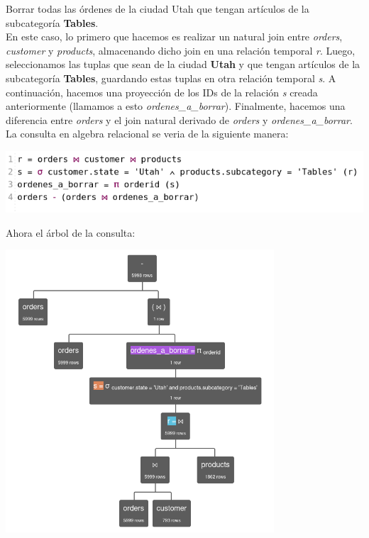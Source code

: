Borrar todas las órdenes de la ciudad Utah que tengan artículos de la subcategoría \textbf{Tables}. \\

En este caso, lo primero que hacemos es realizar un natural join entre \textit{orders}, \textit{customer} y \textit{products}, almacenando dicho join en una relación temporal \textit{r}. Luego, seleccionamos las tuplas que sean de la ciudad \textbf{Utah} y que tengan artículos de la subcategoría \textbf{Tables}, guardando estas tuplas en otra relación temporal \textit{s}. A continuación, hacemos una proyección de los IDs de la relación \textit{s} creada anteriormente (llamamos a esto \textit{ordenes\_a\_borrar}). Finalmente, hacemos una diferencia entre \textit{orders} y el join natural derivado de \textit{orders} y \textit{ordenes\_a\_borrar}. \\

La consulta en algebra relacional se veria de la siguiente manera: \\

\begin{center}
    \includegraphics[width=14cm]{resources/pregunta2/3.2.1.png} \\
\end{center}

Ahora el árbol de la consulta: \\

\begin{center}
    \includegraphics[width=10cm]{resources/pregunta2/3.2.2.png} \\
\end{center}

